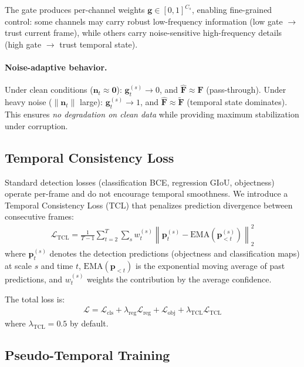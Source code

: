 \documentclass[review]{eccv2026}
\begin{document}
The gate produces per-channel weights $\bm{g} \in [0,1]^{C_s}$, enabling fine-grained control: some channels may carry robust low-frequency information (low gate $\to$ trust current frame), while others carry noise-sensitive high-frequency details (high gate $\to$ trust temporal state).

\paragraph{Noise-adaptive behavior.}
Under clean conditions ($\bm{n}_t \approx \bm{0}$): $\bm{g}_t^{(s)} \to 0$, and $\hat{\bm{F}} \approx \bm{F}$ (pass-through).
Under heavy noise ($\|\bm{n}_t\|$ large): $\bm{g}_t^{(s)} \to 1$, and $\hat{\bm{F}} \approx \tilde{\bm{F}}$ (temporal state dominates).
This ensures \textit{no degradation on clean data} while providing maximum stabilization under corruption.

\subsection{Temporal Consistency Loss}
\label{sec:tcl}

Standard detection losses (classification BCE, regression GIoU, objectness) operate per-frame and do not encourage temporal smoothness. We introduce a Temporal Consistency Loss (TCL) that penalizes prediction divergence between consecutive frames:
\begin{align}
  \mathcal{L}_\text{TCL} = \frac{1}{T-1} \sum_{t=2}^{T} \sum_{s} w_t^{(s)} \left\| \bm{p}_t^{(s)} - \text{EMA}(\bm{p}_{<t}^{(s)}) \right\|_2^2 \label{eq:tcl}
\end{align}
where $\bm{p}_t^{(s)}$ denotes the detection predictions (objectness and classification maps) at scale $s$ and time $t$, $\text{EMA}(\bm{p}_{<t})$ is the exponential moving average of past predictions, and $w_t^{(s)}$ weights the contribution by the average confidence.

The total loss is:
\begin{align}
  \mathcal{L} = \mathcal{L}_\text{cls} + \lambda_\text{reg}\mathcal{L}_\text{reg} + \mathcal{L}_\text{obj} + \lambda_\text{TCL}\mathcal{L}_\text{TCL} \label{eq:total_loss}
\end{align}
where $\lambda_\text{TCL} = 0.5$ by default.

\subsection{Pseudo-Temporal Training}
\label{sec:pseudo_temporal}
\end{document}
